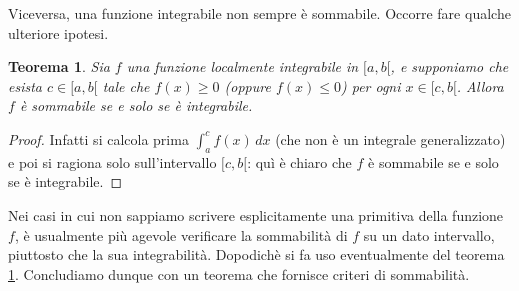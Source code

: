 \documentclass{article}
\theoremstyle{plain}
\newtheorem{thm}{Teorema}[section]
\theoremstyle{definition}
\theoremstyle{remark}
\begin{document}
\vspace{10pt}

Viceversa, una funzione integrabile non sempre è sommabile. Occorre fare qualche ulteriore ipotesi.

\vspace{10pt}

\begin{bxthm}
\begin{thm}\label{sedici}
    Sia $f$ una funzione localmente integrabile in $[a,b[$, e supponiamo che esista $c\in [a,b[$ tale che $f(x)\geq0$ (oppure $f(x)\leq0$) per ogni $x\in [c,b[$. 
    Allora $f$ è sommabile se e solo se è integrabile.
\end{thm}
\end{bxthm}
\begin{proof}
    Infatti si calcola prima $\int_{a}^{c}f(x)\,dx$ (che non è un integrale generalizzato) e poi si ragiona solo sull'intervallo $[c,b[$: quì è chiaro che $f$ è sommabile se e solo se è integrabile.
\end{proof}

\vspace{10pt}

Nei casi in cui non sappiamo scrivere esplicitamente una primitiva della funzione $f$, è usualmente più agevole verificare la 
sommabilità di $f$ su un dato intervallo, piuttosto che la sua integrabilità. Dopodichè si fa uso eventualmente del teorema \ref{sedici}. 
Concludiamo dunque con un teorema che fornisce criteri di sommabilità.

\vspace{10pt}
\end{document}
